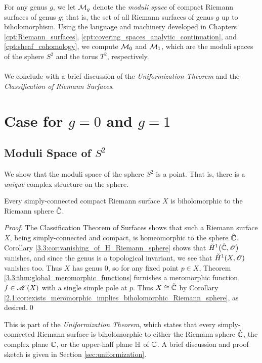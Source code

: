 \documentclass[../Moduli_Spaces_of_Riemann_Surfaces.tex]{subfiles}
\begin{document}
    For any genus $g$, we let $\mathcal{M}_g$ denote the \textit{moduli space} of compact Riemann surfaces of genus $g$; that is, the set of all Riemann surfaces of genus $g$ up to biholomorphism. Using the language and machinery developed in Chapters \ref{cpt:Riemann_surfaces}, \ref{cpt:covering_spaces_analytic_continuation}, and \ref{cpt:sheaf_cohomology}, we compute $\mathcal{M}_0$ and $\mathcal{M}_1$, which are the moduli spaces of the sphere $S^2$ and the torus $T^2$, respectively.\\\ \\
    We conclude with a brief discussion of the \textit{Uniformization Theorem} and the \textit{Classification of Riemann Surfaces}.
    \section{Case for $g=0$ and $g=1$}
    \subsection{Moduli Space of $S^2$}\label{sec:moduli_space_of_sphere}
    We show that the moduli space of the sphere $S^2$ is a point. That is, there is a \textit{unique} complex structure on the sphere.
    \begin{theorem}\label{4.1:thm:simply-connect_compact_biholomorphic_Riemann_sphere}
        Every simply-connected compact Riemann surface $X$ is biholomorphic to the Riemann sphere $\hat{\mathbb{C}}$.
    \end{theorem}
    \begin{proof}
        The Classification Theorem of Surfaces shows that such a Riemann surface $X$, being simply-connected and compact, is homeomorphic to the sphere $\hat{\mathbb{C}}$. Corollary \ref{3.3:cor:vanishing_of_H_Riemann_sphere} shows that $\check{H}^1\big(\hat{\mathbb{C}},\mathscr{O}\big)$ vanishes, and since the genus is a topological invariant, we see that $\check{H}^1\!\left(X,\mathscr{O}\right)$ vanishes too. Thus $X$ has genus $0$, so for any fixed point $p\in X$, Theorem \ref{3.3:thm:global_meromorphic_functions} furnishes a meromorphic function $f\in\mathscr{M}\left(X\right)$ with a single simple pole at $p$. Thus $X\cong\hat{\mathbb{C}}$ by Corollary \ref{2.1:cor:exists_meromorphic_implies_biholomorphic_Riemann_sphere}, as desired.\qed
    \end{proof}
    \begin{remark}
        This is part of the \textit{Uniformization Theorem}, which states that every simply-connected Riemann surface is biholomorphic to either the Riemann sphere $\hat{\mathbb{C}}$, the complex plane $\mathbb{C}$, or the upper-half plane $\mathbb{H}$ of $\mathbb{C}$. A brief discussion and proof sketch is given in Section \ref{sec:uniformization}.\exqed
    \end{remark}
\end{document}
